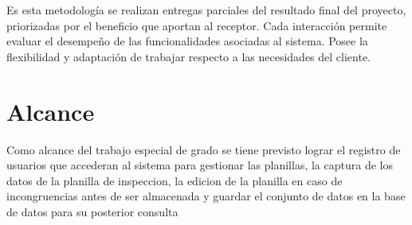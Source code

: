 Es esta metodología se realizan entregas parciales del resultado final del proyecto, priorizadas por el beneficio que aportan al receptor. Cada interacción permite evaluar el desempeño de las funcionalidades asociadas al sistema. Posee la flexibilidad y adaptación de trabajar respecto a las necesidades del cliente. 

\setlength{\parskip}{0mm}


\section{Alcance}

Como alcance del trabajo especial de grado se tiene previsto lograr el registro de usuarios que accederan al sistema para gestionar las planillas, la captura de los datos de la planilla de inspeccion, la edicion de la planilla en caso de incongruencias antes de ser almacenada y guardar el conjunto de datos en la base de datos para su posterior consulta




